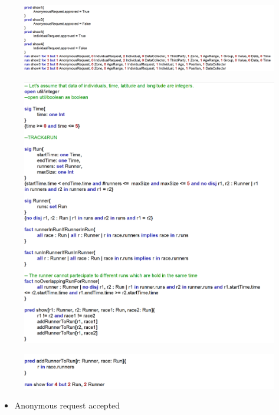 \documentclass{article}
\begin{document}
\begin{legal}
\begin{figure}[H]
		\end{figure}
		\begin{figure}[H]
			\includegraphics[width=\linewidth]{../images/alloy/code/data4Help_5.PNG}
		\end{figure}
		\newpage
		\begin{figure}[H]
			\includegraphics[width=\linewidth]{../images/alloy/code/track4Run_1.PNG}
		\end{figure}
		\begin{figure}[H]
			\includegraphics[width=\linewidth]{../images/alloy/code/track4Run_2.PNG}
		\end{figure}		
		\begin{itemize}
			\newpage
			\item Anonymous request accepted

\end{itemize}
\end{legal}
\end{document}
